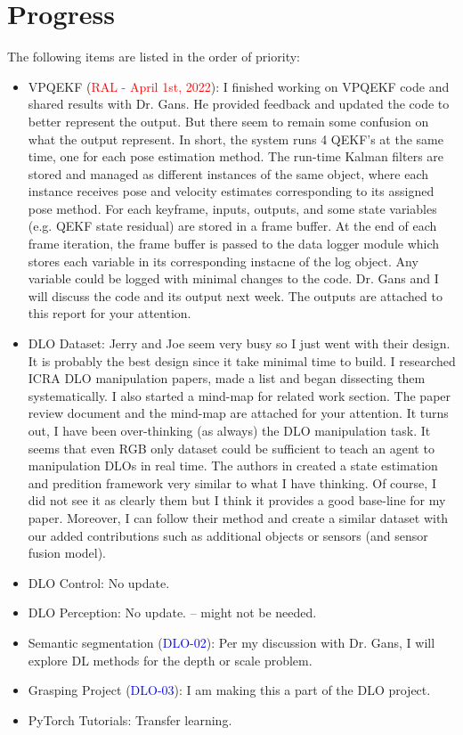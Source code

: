 \documentclass[11pt]{article}
\begin{document}
\section{Progress}
The following items are listed in the order of priority:
\begin{itemize}
    \item VPQEKF (\textcolor{red}{RAL - April 1st, 2022}): I finished working on
    VPQEKF code and shared results with Dr. Gans. He provided feedback and updated
    the code to better represent the output. But there seem to remain some confusion
    on what the output represent. In short, the system runs 4 QEKF's at the same
    time, one for each pose estimation method. The run-time Kalman filters are
    stored and managed as different instances of the same object, where each instance
    receives pose and velocity estimates corresponding to its assigned pose method.
    For each keyframe, inputs, outputs, and some state variables (e.g. QEKF state
    residual) are stored in a frame buffer. At the end of each frame iteration,
    the frame buffer is passed to the data logger module which stores each variable
    in its corresponding instacne of the log object. Any variable could be logged
    with minimal changes to the code. Dr. Gans and I will discuss the code and its
    output next week. The outputs are attached to this report for your attention.

    \item DLO Dataset: Jerry and Joe seem very busy so I just went with their
    design. It is probably the best design since it take minimal time to build.
    I researched ICRA DLO manipulation papers, made a list and began dissecting
    them systematically. I also started a mind-map for related work section. The
    paper review document and the mind-map are attached for your attention. It
    turns out, I have been over-thinking (as always) the DLO manipulation task.
    It seems that even RGB only dataset could be sufficient to teach an agent to
    manipulation DLOs in real time. The authors in \cite{zhang2021deformable}
    created a state estimation and predition framework very similar to what I
    have thinking. Of course, I did not see it as clearly them but I think it
    provides a good base-line for my paper. Moreover, I can follow their method
    and create a similar dataset with our added contributions such as additional
    objects or sensors (and sensor fusion model).

    \item DLO Control: No update.
    \item DLO Perception: No update. -- might not be needed.

    \item Semantic segmentation (\textcolor{blue}{DLO-02}): Per my discussion with Dr. Gans, I will explore DL methods for the depth or scale problem.
    \item Grasping Project (\textcolor{blue}{DLO-03}): I am making this a part of the DLO project.
    \item PyTorch Tutorials: Transfer learning.

  \end{itemize}
\end{document}
